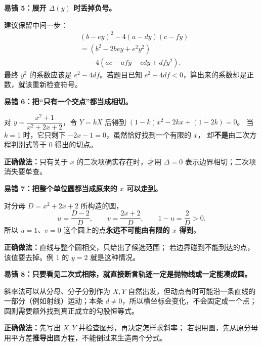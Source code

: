 \clearpage
\begin{trapbox}
\textbf{\textcolor{CTrap}{易错 5：展开 $\Delta(y)$ 时丢掉负号。}}
\begin{center}\end{center}


  \medskip
  建议保留中间一步：
  \[
    \begin{aligned}
      &(b-ey)^2-4(a-dy)(c-fy)\\
      &=(b^2-2bey+e^2y^2)\\
      &\quad-4(ac-afy-cdy+dfy^2).
    \end{aligned}
  \]
  最终 $y^2$ 的系数应该是 $e^2-4df$。若题目已知 $e^2-4df<0$，算出来的系数却是正数，就该重新检查符号。


  \bigskip
\end{trapbox}
\clearpage
\begin{trapbox}
\textbf{\textcolor{CTrap}{易错 6：把“只有一个交点”都当成相切。}}
\begin{center}\end{center}


  \medskip
  对 $y=\dfrac{x^2+1}{x^2+2x+2}$，令 $Y=kX$ 后得到
  $(1-k)x^2-2kx+(1-2k)=0$。
  当 $k=1$ 时，它只剩下 $-2x-1=0$，虽然恰好找到一个有限的 $x$，
  却\textbf{不是}由二次方程判别式等于 $0$ 得出的切点。
  \par\textbf{正确做法：}只有关于 $x$ 的二次项确实存在时，才用 $\Delta=0$ 表示边界相切；二次项消失要单查。

  \bigskip
\end{trapbox}
\clearpage
\begin{trapbox}
\textbf{\textcolor{CTrap}{易错 7：把整个单位圆都当成原来的 $x$ 可以走到。}}
\begin{center}\end{center}


  \medskip
  对分母 $D=x^2+2x+2$ 所构造的圆，
  \[
    u=\frac{D-2}{D},\qquad v=\frac{2x+2}{D},
    \qquad 1-u=\frac2D>0.
  \]
  所以 $u=1$、$v=0$ 这个圆上的点\textbf{永远不可能由有限的 $x$ 得到}。
  \par\textbf{正确做法：}直线与整个圆相交，只给出了候选范围；
  若边界碰到不能到达的点，该值要去掉。例 1 的 $y=2$ 就是这种情况。

  \bigskip
\end{trapbox}
\clearpage
\begin{trapbox}
\textbf{\textcolor{CTrap}{易错 8：只要看见二次式相除，就直接断言轨迹一定是抛物线或一定能凑成圆。}}
\begin{center}\end{center}


  \medskip
  斜率法可以从分母、分子分别作为 $X,Y$ 自然出发，但动点有时可能沿一条直线的一部分（例如射线）运动；本条 $d\ne0$，所以横坐标会变化，不会固定成一个点；
  圆则需要额外找到真正成立的勾股恒等式。
  \par\textbf{正确做法：}先写出 $X,Y$ 并检查图形，再决定怎样求斜率；
  若想用圆，先从原分母用平方差\textbf{推导出}圆方程，不能倒过来生造两个分式。
\end{trapbox}

